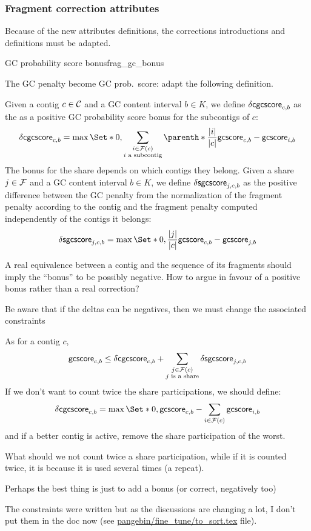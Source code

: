 \subsubsection{Fragment correction attributes}

\begin{fixmebox}
  Because of the new attributes definitions, the corrections introductions and definitions must be adapted.
\end{fixmebox}

\begin{definition}{GC probability score bonus}{frag_gc_bonus}
  \begin{fixmebox}
    The GC penalty become GC prob.\ score: adapt the following definition.
  \end{fixmebox}
  Given a contig \(c \in \mathcal{C}{}\) and a GC content interval \(b \in K\), we define \(\mathsf{\delta cgcscore}_{c, b}\) as the as a positive GC probability score bonus for the subcontigs of \(c\):
  \[
    \dcgcscore{c}{b} = \max \Set*{
      0,
      \sum_{\substack{
          i \in \Fragments{}(c) \\ i \text{ a subcontig}
      }}
      \parenth*{
        \frac{|i|}{|c|}\gcscore{c}{b} - \gcscore{i}{b}
      }
    }
  \]
  The bonus for the share depends on which contigs they belong.
  Given a share \(j \in \mathcal{F}{}\) and a GC content interval \(b \in K\), we define \(\mathsf{\delta sgcscore}_{j, c, b}\) as the positive difference between the GC penalty from the normalization of the fragment penalty according to the contig and the fragment penalty computed independently of the contigs it belongs:
  \[
    \dsgcscore{j}{c}{b} = \max \Set*{
      0,
      \frac{|j|}{|c|} \gcscore{c}{b} - \gcscore{j}{b}
    }
  \]
  \begin{questionbox}
    A real equivalence between a contig and the sequence of its fragments should imply the \enquote{bonus} to be possibly negative.
    How to argue in favour of a positive bonus rather than a real correction?

    Be aware that if the deltas can be negatives, then we must change the associated constraints
  \end{questionbox}
\end{definition}

\begin{ideabox}
  As for a contig \(c\),
  \[
    \mathsf{gcscore}_{c, b} \leq \mathsf{\delta cgcscore}_{c, b} + \sum_{\substack{
        j \in \mathcal{F}{}(c) \\
        j \text{ is a share}
    }}\mathsf{\delta sgcscore}_{j, c, b}
  \]
  If we don't want to count twice the share participations, we should define:
  \[
    \dcgcscore{c}{b} = \max \Set*{
      0,
      \gcscore{c}{b} - \sum_{i \in \Fragments{}(c)} \gcscore{i}{b}
    }
  \]
  and if a better contig is active, remove the share participation of the worst.

  \begin{questionbox}
    What should we not count twice a share participation, while if it is counted twice, it is because it is used several times (a repeat).

    Perhaps the best thing is just to add a bonus (or correct, negatively too)
  \end{questionbox}
\end{ideabox}

\begin{notebox}
  The constraints were written but as the discussions are changing a lot, I don't put them in the doc now (see \url{pangebin/fine_tune/to_sort.tex} file).
\end{notebox}